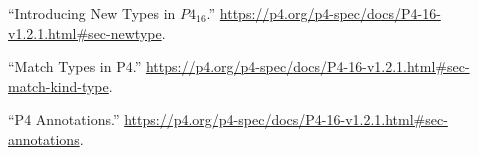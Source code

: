 \documentclass[11pt]{article}
\begin{document}
{{\begin{thebibliography}{40}
\mdbibitemlabel{{}[12]}\textquotedblleft{}Introducing New Types in $P4_{16}$.\textquotedblright{} \href{https://p4.org/p4-spec/docs/P4-16-v1.2.1.html\%23sec-newtype}{{\ttfamily https://\hspace{0pt}p4.\hspace{0pt}org/\hspace{0pt}p4-\hspace{0pt}spec/\hspace{0pt}docs/\hspace{0pt}P4-\hspace{0pt}16-\hspace{0pt}v1.\hspace{0pt}2.\hspace{0pt}1.\hspace{0pt}html\#\hspace{0pt}sec-\hspace{0pt}newtype}}.\label{p4newtypes}%

\mdbibitemlabel{{}[13]}\textquotedblleft{}Match Types in P4.\textquotedblright{} \href{https://p4.org/p4-spec/docs/P4-16-v1.2.1.html\%23sec-match-kind-type}{{\ttfamily https://\hspace{0pt}p4.\hspace{0pt}org/\hspace{0pt}p4-\hspace{0pt}spec/\hspace{0pt}docs/\hspace{0pt}P4-\hspace{0pt}16-\hspace{0pt}v1.\hspace{0pt}2.\hspace{0pt}1.\hspace{0pt}html\#\hspace{0pt}sec-\hspace{0pt}match-\hspace{0pt}kind-\hspace{0pt}type}}.\label{p4matchtypes}%

\mdbibitemlabel{{}[14]}\textquotedblleft{}P4 Annotations.\textquotedblright{} \href{https://p4.org/p4-spec/docs/P4-16-v1.2.1.html\%23sec-annotations}{{\ttfamily https://\hspace{0pt}p4.\hspace{0pt}org/\hspace{0pt}p4-\hspace{0pt}spec/\hspace{0pt}docs/\hspace{0pt}P4-\hspace{0pt}16-\hspace{0pt}v1.\hspace{0pt}2.\hspace{0pt}1.\hspace{0pt}html\#\hspace{0pt}sec-\hspace{0pt}annotations}}.\label{p4annotations}%


\end{thebibliography}}}
\end{document}
